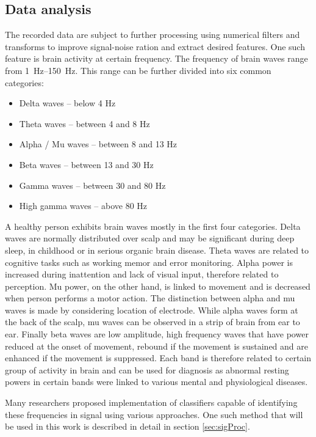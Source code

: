 \subsection{Data analysis}
\label{sub:dataAnalysis}
The recorded data are subject to further processing using numerical filters and
transforms to improve signal-noise ration and extract desired features. 
One such feature is brain activity at certain frequency. The frequency of brain
waves range from \SIrange{1}{150}{\Hz}. This range can be further divided
into six common categories\cite{dominantF}:
\begin{itemize}
  \item Delta waves -- below 4 Hz
  \item Theta waves -- between 4 and 8 Hz
  \item Alpha / Mu waves -- between 8 and 13 Hz
  \item Beta waves -- between 13 and 30 Hz
  \item Gamma waves -- between 30 and 80 Hz
  \item High gamma waves -- above 80 Hz
\end{itemize}
A healthy person exhibits brain waves mostly in the first four categories. Delta
waves are normally distributed over scalp and may be significant during deep
sleep, in childhood or in serious organic brain disease.\cite{eegClass} Theta
waves are related to cognitive tasks such as working memor and error monitoring.
Alpha power is increased during inattention and lack of visual input, therefore
related to perception. Mu power, on the other hand, is linked to movement and is
decreased when person performs a motor action. The distinction between alpha and
mu waves is made by considering location of electrode. While alpha waves form at
the back of the scalp, mu waves can be observed in a strip of brain from ear to
ear. Finally beta waves are low amplitude, high frequency waves that have power
reduced at the onset of movement, rebound if the movement is sustained and are
enhanced if the movement is suppressed. Each band is therefore related to
certain group of activity in brain and can be used for diagnosis as abnormal
resting powers in certain bands were linked to various mental and physiological
diseases.\cite{dominantF}

Many researchers proposed implementation of classifiers capable of identifying
these frequencies in signal using various approaches. One such method that will
be used in this work is described in detail in section \ref{sec:sigProc}.

